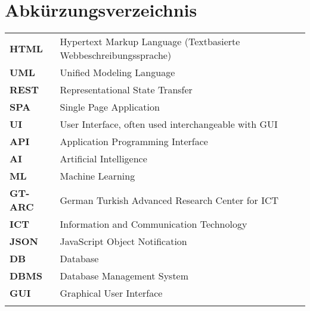 {}
\chapter*{Abkürzungsverzeichnis}

\begin{center}
\begin{tabular}{ll}

\textbf{HTML}	&	Hypertext Markup Language (Textbasierte Webbeschreibungssprache)\\
\textbf{UML}	&	Unified Modeling Language\\
\textbf{REST}	&	Representational State Transfer\\
\textbf{SPA}	&	Single Page Application\\
\textbf{UI}		&	User Interface, often used interchangeable with GUI\\
\textbf{API}	&	Application Programming Interface\\
\textbf{AI}		&	Artificial Intelligence\\
\textbf{ML}	&	Machine Learning\\
\textbf{GT-ARC}	&	German Turkish Advanced Research Center for ICT\\
\textbf{ICT}	&	Information and Communication Technology\\
\textbf{JSON}	&	JavaScript Object Notification\\
\textbf{DB}	&	Database\\
\textbf{DBMS}	&	Database Management System\\
\textbf{GUI}	&	Graphical User Interface\\
\textbf{}		&	\\




\end{tabular}
\end{center}














